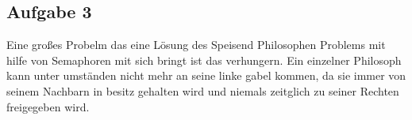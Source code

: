 \subsection*{Aufgabe 3}

Eine großes Probelm das eine Lösung des Speisend Philosophen Problems mit hilfe von Semaphoren mit sich bringt ist das verhungern. Ein einzelner Philosoph kann unter umständen nicht mehr an seine linke gabel kommen, da sie immer von seinem Nachbarn in besitz gehalten wird und niemals zeitglich zu seiner Rechten freigegeben wird. 
